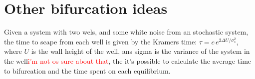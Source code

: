 \section{Other bifurcation ideas}


Given a system with two wels, and some white noise from an stochastic system, the time to scape from each well is given by the 
Kramers time\cite{...}: $\tau=c\, e^{2\Delta U/\sigma_s^2}$, where $U$ is the wall height of the well, ans sigma is the variance of the system in the well\textcolor{red}{i'm not os sure about that}, the it's possible to calculate the average time to bifurcation and the time spent on each equilibrium. 